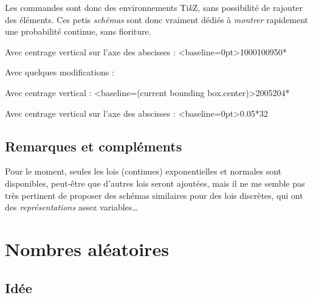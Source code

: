 \documentclass[a4paper,french,11pt]{article}
\providecommand\tikzlogo{Ti\textit{k}Z}
\let\TikZ\tikzlogo
\begin{document}
\begin{codeinfo}
Les commandes sont donc des environnements \TikZ, sans possibilité de \og rajouter \fg{} des éléments. Ces petis \textit{schémas} sont donc vraiment dédiés à \textit{montrer} rapidement une probabilité continue, sans fioriture.
\end{codeinfo}

\begin{codetex}
Avec centrage vertical sur l'axe des abscisses :
\LoiNormaleGraphe
	[AfficheM=false,CouleurCourbe=Blue,CouleurAire=LightBlue]<baseline=0pt>{1000}{100}{950}{*}
\end{codetex}

\begin{codetex}
Avec quelques modifications :


\medskip

Avec centrage vertical :
\LoiNormaleGraphe[Largeur=5,Hauteur=2.5]<baseline=(current bounding box.center)>{200}{5}{204}{*}

\medskip

Avec centrage vertical sur l'axe des abscisses :
\LoiExpoGraphe
	[AfficheM=false,CouleurCourbe=Blue,CouleurAire=LightBlue]<baseline=0pt>{0.05}{*}{32}

\medskip

\end{codetex}

\subsection{Remarques et compléments}

\begin{codeinfo}
Pour le moment, seules les lois (continues) exponentielles et normales sont disponibles, peut-être que d'autres lois seront ajoutées, mais il ne me semble pas très pertinent de proposer des schémas similaires pour des lois discrètes, qui ont des \textit{représentations} assez variables\ldots
\end{codeinfo}

\newpage

\section{Nombres aléatoires}\label{entiersaleatoires}

\subsection{Idée}
\end{document}
